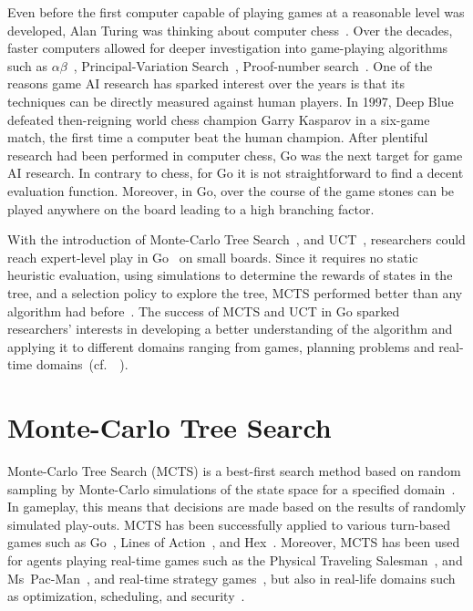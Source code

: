 \documentclass{kecsmstr}
\newcommand{\cf}{{cf.}~}
\begin{document}
Even before the first computer capable of playing games at a reasonable level was developed, Alan Turing was thinking about computer chess~. Over the decades, faster computers allowed for deeper investigation into game-playing algorithms such as $\alpha\beta$~, Principal-Variation Search~, Proof-number search~. One of the reasons game AI research has sparked interest over the years is that its techniques can be directly measured against human players. In 1997, {\sc Deep Blue}~ defeated then-reigning world chess champion Garry Kasparov in a six-game match, the first time a computer beat the human champion. After plentiful research had been performed in computer chess, Go was the next target for game AI research. In contrary to chess, for Go it is not straightforward to find a decent evaluation function. Moreover, in Go, over the course of the game stones can be played anywhere on the board leading to a high branching factor.

With the introduction of Monte-Carlo Tree Search~, and UCT~, researchers could reach expert-level play in Go~ on small boards. Since it requires no static heuristic evaluation, using simulations to determine the rewards of states in the tree, and a selection policy to explore the tree, MCTS performed better than any algorithm had before~. The success of MCTS and UCT in Go sparked researchers' interests in developing a better understanding of the algorithm and applying it to different domains ranging from games, planning problems and real-time domains~(\cf~).
\newpage
\section{Monte-Carlo Tree Search}
Monte-Carlo Tree Search (MCTS) is a best-first search method based on random sampling by Monte-Carlo simulations of the state space for a specified domain~. In gameplay, this means that decisions are made based on the results of randomly simulated play-outs. MCTS has been successfully applied to various turn-based games such as Go~, Lines of Action~, and Hex~. Moreover, MCTS has been used for agents playing real-time games such as the Physical Traveling Salesman~, and Ms~Pac-Man~, and real-time strategy games~, but also in real-life domains such as optimization, scheduling, and security~.
\end{document}
